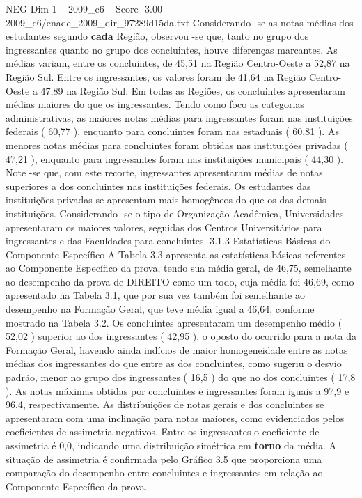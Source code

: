 \begin{textsample}{NEG Dim 1 – 2009\_c6 – Score -3.00 – 2009\_c6/enade\_2009\_dir\_97289d15da.txt}
Considerando -se as notas médias dos estudantes segundo \textbf{cada} Região, observou -se que, tanto no grupo dos ingressantes quanto no grupo dos concluintes, houve diferenças marcantes.
As médias variam, entre os concluintes, de 45,51 na Região Centro-Oeste a 52,87 na Região Sul.
Entre os ingressantes, os valores foram de 41,64 na Região Centro-Oeste a 47,89 na Região Sul.
Em todas as Regiões, os concluintes apresentaram médias maiores do que os ingressantes.
Tendo como foco as categorias administrativas, as maiores notas médias para ingressantes foram nas instituições federais ( 60,77 ), enquanto para concluintes foram nas estaduais ( 60,81 ).
As menores notas médias para concluintes foram obtidas nas instituições privadas ( 47,21 ), enquanto para ingressantes foram nas instituições municipais ( 44,30 ).
Note -se que, com este recorte, ingressantes apresentaram médias de notas superiores a dos concluintes nas instituições federais.
Os estudantes das instituições privadas se apresentam mais homogêneos do que os das demais instituições.
Considerando -se o tipo de Organização Acadêmica, Universidades apresentaram os maiores valores, seguidas dos Centros Universitários para ingressantes e das Faculdades para concluintes. 3.1.3 Estatísticas Básicas do Componente Específico A Tabela 3.3 apresenta as estatísticas básicas referentes ao Componente Específico da prova, tendo sua média geral, de 46,75, semelhante ao desempenho da prova de DIREITO como um todo, cuja média foi 46,69, como apresentado na Tabela 3.1, que por sua vez também foi semelhante ao desempenho na Formação Geral, que teve média igual a 46,64, conforme mostrado na Tabela 3.2.
Os concluintes apresentaram um desempenho médio ( 52,02 ) superior ao dos ingressantes ( 42,95 ), o oposto do ocorrido para a nota da Formação Geral, havendo ainda indícios de maior homogeneidade entre as notas médias dos ingressantes do que entre as dos concluintes, como sugeriu o desvio padrão, menor no grupo dos ingressantes ( 16,5 ) do que no dos concluintes ( 17,8 ).
As notas máximas obtidas por concluintes e ingressantes foram iguais a 97,9 e 96,4, respectivamente.
As distribuições de notas gerais e dos concluintes se apresentaram com uma inclinação para notas maiores, como evidenciados pelos coeficientes de assimetria negativos.
Entre os ingressantes o coeficiente de assimetria é 0,0, indicando uma distribuição simétrica em \textbf{torno} da média.
A situação de assimetria é confirmada pelo Gráfico 3.5 que proporciona uma comparação do desempenho entre concluintes e ingressantes em relação ao Componente Específico da prova.

\end{textsample}
